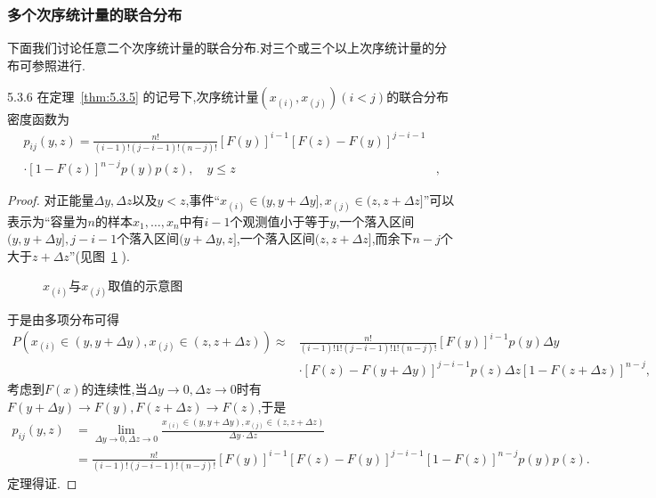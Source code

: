 \subsubsection{多个次序统计量的联合分布}
下面我们讨论任意二个次序统计量的联合分布.对三个或三个以上次序统计量的分布可参照进行.
\begin{theorem}{}{5.3.6}
在定理~\ref{thm:5.3.5} 的记号下,次序统计量$(x_{(i)},x_{(j)})(i<j)$的联合分布密度函数为
\begin{equation}\label{eq:5.3.16}
\begin{aligned}
p_{ij}(y,z)=\frac{n!}{(i-1)!(j-i-1)!(n-j)!}[F(y)]^{i-1}[F(z)-F(y)]^{j-i-1}&\\
\cdot[1-F(z)]^{n-j}p(y)p(z),\quad y\leq z&,
\end{aligned}
\end{equation}
\end{theorem}
\begin{proof}
对正能量$\Delta y,\Delta z$以及$y<z$,事件``$x_{(i)}\in(y,y+\Delta y],x_{(j)}\in(z,z+\Delta z]$''可以表示为``容量为$n$的样本$x_1,\dotsc,x_n$中有$i-1$个观测值小于等于$y$,一个落入区间$(y,y+\Delta y],j-i-1$个落入区间$(y+\Delta y,z]$,一个落入区间$(z,z+\Delta z]$,而余下$n-j$个大于$z+\Delta z$''(见图~\ref{fig:5.3.6} ).
\begin{figure}[!ht]
  \centering
{}
  \caption{$x_{(i)}$与$x_{(j)}$取值的示意图}\label{fig:5.3.6}
\end{figure}

于是由多项分布可得
\begin{align*}
P(x_{(i)}\in(y,y+\Delta y),x_{(j)}\in(z,z+\Delta z))
\approx&\frac{n!}{(i-1)!1!(j-i-1)!1!(n-j)!}[F(y)]^{i-1}p(y)\Delta y\\
 &\cdot[F(z)-F(y+\Delta y)]^{j-i-1}p(z)\Delta z[1-F(z+\Delta z)]^{n-j},
\end{align*}
考虑到$F(x)$的连续性,当$\Delta y\to0,\Delta z\to0$时有$F(y+\Delta y)\to F(y),F(z+\Delta z)\to F(z)$,于是
\begin{align*}
p_{ij}(y,z)&=\lim_{\Delta y\to0,\Delta z\to0}
\frac{x_{(i)}\in(y,y+\Delta y),x_{(j)}\in(z,z+\Delta z)}{\Delta y\cdot\Delta z}\\
&=\frac{n!}{(i-1)!(j-i-1)!(n-j)!}[F(y)]^{i-1}[F(z)-F(y)]^{j-i-1}[1-F(z)]^{n-j}p(y)p(z).
\end{align*}
定理得证.
\end{proof}

